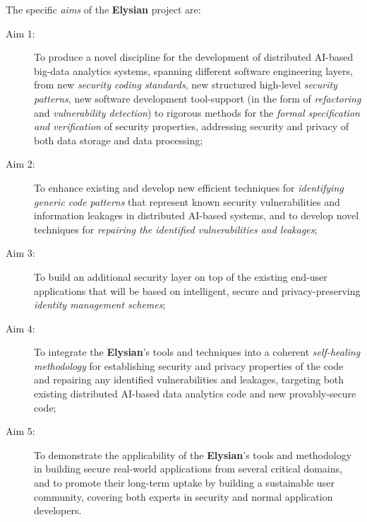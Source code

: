 \documentclass[a4paper,11pt]{article}
\newcommand{\project}[1]{\textbf{#1}\xspace}
\newcommand{\SECURITY}{\project{Elysian}}
\newcommand{\TheProject}{\SECURITY}
\begin{document}


The specific \emph{aims} of the \TheProject{} project are:

\begin{description}
\item[Aim 1:] To produce a novel discipline for the development of distributed AI-based big-data analytics systems, spanning different software engineering layers, from new \emph{security coding standards}, new structured high-level \emph{security patterns}, new software development tool-support (in the form of \emph{refactoring} and \emph{vulnerability detection}) to rigorous methods for the \emph{formal specification and verification} of security properties, addressing security and privacy of both data storage and data processing;

\item[Aim 2:] To %
enhance existing and develop new efficient techniques for \emph{identifying generic code patterns} that
  represent known security vulnerabilities and information leakages in distributed AI-based systems, and to develop novel techniques for  
  \emph{repairing the identified vulnerabilities and leakages};

\item[Aim 3:] To build an additional security layer on top of the existing end-user applications that will be based on intelligent, secure and privacy-preserving \emph{identity management schemes};

\item[Aim 4:] To integrate the \TheProject{}'s tools and techniques into a coherent \emph{self-healing methodology} for establishing
  security and privacy properties of the code and repairing any identified vulnerabilities and leakages, targeting both 
  existing distributed AI-based data analytics code and new provably-secure code;

\item[Aim 5:]  To demonstrate the applicability of the \TheProject{}'s tools and
 methodology in building secure real-world applications from 
 several critical %
 domains, and to promote their long-term uptake by building a sustainable user community,
 covering both experts in security and normal application developers.

\end{description}
\end{document}
